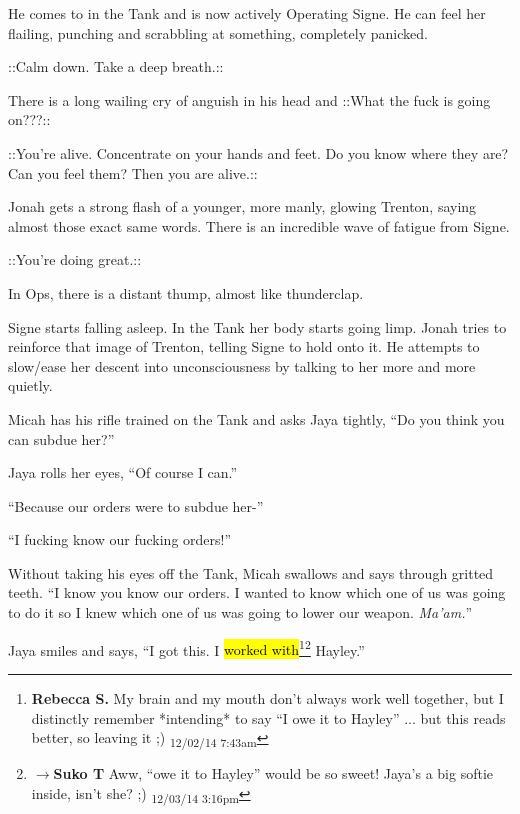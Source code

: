He comes to in the Tank and is now actively Operating Signe.  He can feel her flailing, punching and scrabbling at something, completely panicked.

 {\color[RGB]{194,123,160}::Calm down.  Take a deep breath.::} 

There is a long wailing cry of anguish in his head and  {\color[RGB]{106,168,79}::What the fuck is going on???::} 

 {\color[RGB]{194,123,160}::You're alive.  Concentrate on your hands and feet.  Do you know where they are?  Can you feel them?  Then you are alive.::} 

Jonah gets a strong flash of a younger, more manly, glowing Trenton, saying almost those exact same words.  There is an incredible wave of fatigue from Signe.

 {\color[RGB]{194,123,160}::You're doing great.::} 



In Ops, there is a distant thump, almost like thunderclap.



Signe starts falling asleep.  In the Tank her body starts going limp.  Jonah tries to reinforce that image of Trenton, telling Signe to hold onto it.  He attempts to slow/ease her descent into unconsciousness by talking to her more and more quietly.





Micah has his rifle trained on the Tank and asks Jaya tightly, ``Do you think you can subdue her?''

Jaya rolls her eyes, ``Of course I can.''

``Because our orders were to subdue her-''

``I fucking know our fucking orders!''

Without taking his eyes off the Tank, Micah swallows and says through gritted teeth.  ``I know you know our orders.  I wanted to know which one of us was going to do it so I knew which one of us was going to lower our weapon.  \textit{Ma'am.}''

Jaya smiles and says, ``I got this.  I \hl{worked with}\footnote{\textbf{Rebecca S. }My brain and my mouth don't always work well together, but I distinctly remember *intending* to say ``I owe it to Hayley''  ... but this reads better, so leaving it ;) \textsubscript{12/02/14 7:43am}}\footnote{$\rightarrow$\textbf{Suko T }Aww, ``owe it to Hayley'' would be so sweet!   Jaya's a big softie inside, isn't she? ;) \textsubscript{12/03/14 3:16pm}} Hayley.''

